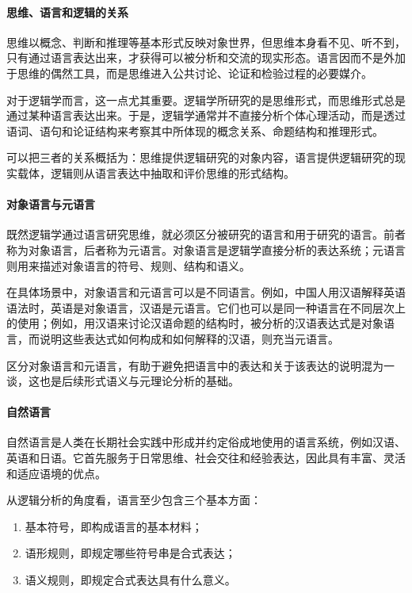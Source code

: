 \paragraph{思维、语言和逻辑的关系}\label{logic.relation_between_thought_language_and_logic}

思维以概念、判断和推理等基本形式反映对象世界，但思维本身看不见、听不到，只有通过语言表达出来，才获得可以被分析和交流的现实形态。语言因而不是外加于思维的偶然工具，而是思维进入公共讨论、论证和检验过程的必要媒介。

对于逻辑学而言，这一点尤其重要。逻辑学所研究的是思维形式，而思维形式总是通过某种语言表达出来。于是，逻辑学通常并不直接分析个体心理活动，而是透过语词、语句和论证结构来考察其中所体现的概念关系、命题结构和推理形式。

\begin{note}
可以把三者的关系概括为：思维提供逻辑研究的对象内容，语言提供逻辑研究的现实载体，逻辑则从语言表达中抽取和评价思维的形式结构。
\end{note}

\paragraph{对象语言与元语言}\label{logic.object_language_and_metalanguage}

既然逻辑学通过语言研究思维，就必须区分被研究的语言和用于研究的语言。前者称为对象语言，后者称为元语言。对象语言是逻辑学直接分析的表达系统；元语言则用来描述对象语言的符号、规则、结构和语义。

在具体场景中，对象语言和元语言可以是不同语言。例如，中国人用汉语解释英语语法时，英语是对象语言，汉语是元语言。它们也可以是同一种语言在不同层次上的使用；例如，用汉语来讨论汉语命题的结构时，被分析的汉语表达式是对象语言，而说明这些表达式如何构成和如何解释的汉语，则充当元语言。

区分对象语言和元语言，有助于避免把语言中的表达和关于该表达的说明混为一谈，这也是后续形式语义与元理论分析的基础。

\paragraph{自然语言}\label{logic.natural_language}

自然语言是人类在长期社会实践中形成并约定俗成地使用的语言系统，例如汉语、英语和日语。它首先服务于日常思维、社会交往和经验表达，因此具有丰富、灵活和适应语境的优点。

从逻辑分析的角度看，语言至少包含三个基本方面：

\begin{enumerate}
	\item 基本符号，即构成语言的基本材料；
	\item 语形规则，即规定哪些符号串是合式表达；
	\item 语义规则，即规定合式表达具有什么意义。
\end{enumerate}

